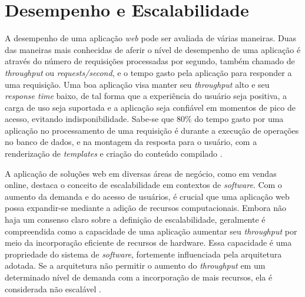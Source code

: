 \section{Desempenho e Escalabilidade}

A desempenho de uma aplicação \textit{web} pode ser avaliada de várias maneiras. Duas das maneiras mais conhecidas de aferir o nível de desempenho de uma aplicação é através do número de requisições processadas por segundo, também chamado de \textit{throughput} ou \textit{requests/second}, e o tempo gasto pela aplicação para responder a uma requisição. Uma boa aplicação visa manter seu \textit{throughput} alto e seu \textit{response time} baixo, de tal forma que a experiência do usuário seja positiva, a carga de uso seja suportada e a aplicação seja confiável em momentos de pico de acesso, evitando indisponibilidade. Sabe-se que 80\% do tempo gasto por uma aplicação no processamento de uma requisição é durante a execução de operações no banco de dados, e na montagem da resposta para o usuário, com a renderização de \textit{templates} e criação do conteúdo compilado \cite{jugo2014analysis}.

A aplicação de soluções web em diversas áreas de negócio, como em vendas online, destaca o conceito de escalabilidade em contextos de \textit{software}. Com o aumento da demanda e do acesso de usuários, é crucial que uma aplicação web possa expandir-se mediante a adição de recursos computacionais. Embora não haja um consenso claro sobre a definição de escalabilidade, geralmente é compreendida como a capacidade de uma aplicação aumentar seu \textit{throughput} por meio da incorporação eficiente de recursos de hardware. Essa capacidade é uma propriedade do sistema de \textit{software}, fortemente influenciada pela arquitetura adotada. Se a arquitetura não permitir o aumento do \textit{throughput} em um determinado nível de demanda com a incorporação de mais recursos, ela é considerada não escalável \cite{williams2004web}.